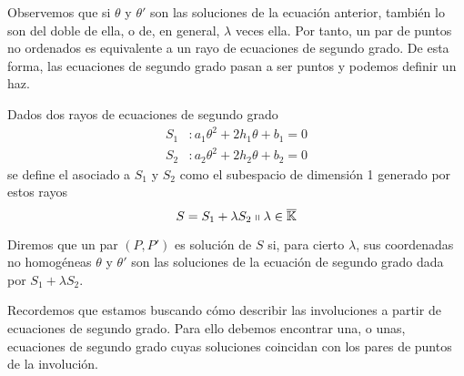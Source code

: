 Observemos que si $\theta$ y $\theta'$ son las soluciones de la ecuación anterior, también lo son del doble de ella, o de, en general, $\lambda$ veces ella. Por tanto, un par de puntos no ordenados es equivalente a un rayo de ecuaciones de segundo grado. De esta forma, las ecuaciones de segundo grado pasan a ser puntos y podemos definir un haz.
\begin{defi} Dados dos rayos de ecuaciones de segundo grado
\begin{equation}
	\begin{split}
		S_1&:a_1\theta^2+2h_1\theta+b_1=0\\
		S_2&:a_2\theta^2+2h_2\theta+b_2=0
	\end{split}
\end{equation}
se define el  asociado a $S_1$ y $S_2$ como el subespacio de dimensión 1 generado por estos rayos
\begin{equation}
	S=S_1+\lambda S_2 \shortparallel \lambda\in\overline{\mathbb{K}}
\end{equation}
\end{defi}
Diremos que un par $(P,P')$ es solución de $S$ si, para cierto $\lambda$, sus coordenadas no homogéneas $\theta$ y $\theta'$ son las soluciones de la ecuación de segundo grado dada por $S_1+\lambda S_2$.

Recordemos que estamos buscando cómo describir las involuciones a partir de ecuaciones de segundo grado. Para ello debemos encontrar una, o unas, ecuaciones de segundo grado cuyas soluciones coincidan con los pares de puntos de la involución.

